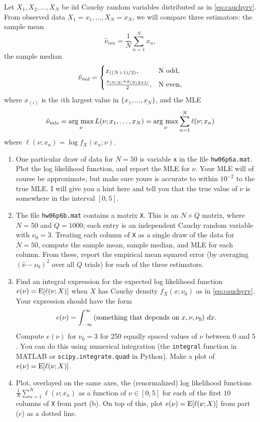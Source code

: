 \documentclass[11pt]{article}
\begin{document}
\begin{enumerate}
 Let $X_1,X_2,\ldots,X_N$ be iid Cauchy random variables distributed as in \eqref{eq:cauchyrv}.  From observed data $X_1=x_1,\ldots,X_N=x_N$, we will compare three estimators: the sample mean
	\[
		\hat\nu_{mn} = \frac{1}{N}\sum_{n=1}^Nx_n,
	\]
	the sample median 
	\[
		\hat\nu_{md} = \begin{cases}
			x_{((N+1)/2)}, & $N$\text{ odd}, \\[2mm]
			\frac{x_{(N/2)}+x_{(N/2+1)}}{2}, & $N$\text{ even},
		\end{cases}
	\]
	where $x_{(i)}$ is the $i$th largest value in $\{x_1,\ldots,x_N\}$, and the MLE
	\[
		\hat\nu_{mle} = \operatorname*{\text{arg~max}}_\nu L(\nu;x_1,\ldots,x_N) = \operatorname*{\text{arg~max}}_{\nu}\sum_{n=1}^N\ell(\nu;x_n)
	\]
	where $\ell(\nu;x_n) = \log f_X(x_n;\nu)$.
\begin{enumerate}
	\item One particular draw of data for $N=50$ is variable \texttt{x} in the file \texttt{hw06p6a.mat}.  Plot the log likelihood function, and report the MLE for $\nu$.  Your MLE will of course be approximate, but make sure yours is accurate to within $10^{-2}$ to the true MLE.  I will give you a hint here and tell you that the true value of $\nu$ is somewhere in the interval $[0,5]$.
	
	\item The file \texttt{hw06p6b.mat} contains a matrix \texttt{X}.  This is an $N\times Q$ matrix, where $N=50$ and $Q=1000$; each entry is an independent Cauchy random variable with $\nu_0=3$.  Treating each column of \texttt{X} as a single draw of the data for $N=50$, compute the sample mean, sample median, and MLE for each column.  From these, report the empirical mean squared error (by averaging $(\hat\nu-\nu_0)^2$ over all $Q$ trials) for each of the three estimators.
	
	\item Find an integral expression for the expected log likelihood function $e(\nu) = \operatorname{E}[\ell(\nu;X)]$ when $X$ has Cauchy density $f_X(x;\nu_0)$ as in \eqref{eq:cauchyrv}.  Your expression should have the form
	\[
		e(\nu) = \int_{-\infty}^\infty \text{(something that depends on $x,\nu,\nu_0$)}~dx.
	\]
	Compute $e(\nu)$ for $\nu_0=3$ for 250 equally spaced values of $\nu$ between $0$ and $5$.  You can do this using numerical integration (the \texttt{integral} function in MATLAB or \texttt{scipy.integrate.quad} in Python).  Make a plot of $e(\nu) = \operatorname{E}[\ell(\nu;X)]$.
	
	\item Plot, overlayed on the same axes, the (renormalized) log likelihood functions $\frac{1}{N}\sum_{n=1}^{N} \ell(\nu;x_n)$ as a function of $\nu\in[0,5]$ for each of the first $10$ columns of \texttt{X} from part (b).  On top of this, plot $e(\nu) = \operatorname{E}[\ell(\nu;X)]$ from part (c) as a dotted line.
	
\end{enumerate}

\end{enumerate}
\end{document}
